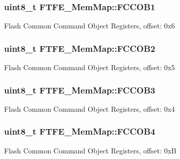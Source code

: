 \subsubsection[{F\+C\+C\+O\+B1}]{\setlength{\rightskip}{0pt plus 5cm}uint8\+\_\+t F\+T\+F\+E\+\_\+\+Mem\+Map\+::\+F\+C\+C\+O\+B1}\label{struct_f_t_f_e___mem_map_ab72be9c808d3ff0a1e61da8c56f59289}
Flash Common Command Object Registers, offset\+: 0x6 \hypertarget{struct_f_t_f_e___mem_map_a3ee3dde0b1da6205c9cbc4a8aba737ee}{}
\subsubsection[{F\+C\+C\+O\+B2}]{\setlength{\rightskip}{0pt plus 5cm}uint8\+\_\+t F\+T\+F\+E\+\_\+\+Mem\+Map\+::\+F\+C\+C\+O\+B2}\label{struct_f_t_f_e___mem_map_a3ee3dde0b1da6205c9cbc4a8aba737ee}
Flash Common Command Object Registers, offset\+: 0x5 \hypertarget{struct_f_t_f_e___mem_map_a0d9b934b80cc5802632699a965acb08c}{}
\subsubsection[{F\+C\+C\+O\+B3}]{\setlength{\rightskip}{0pt plus 5cm}uint8\+\_\+t F\+T\+F\+E\+\_\+\+Mem\+Map\+::\+F\+C\+C\+O\+B3}\label{struct_f_t_f_e___mem_map_a0d9b934b80cc5802632699a965acb08c}
Flash Common Command Object Registers, offset\+: 0x4 \hypertarget{struct_f_t_f_e___mem_map_a67f74d54b4ea83300912bfd3fd13f69c}{}
\subsubsection[{F\+C\+C\+O\+B4}]{\setlength{\rightskip}{0pt plus 5cm}uint8\+\_\+t F\+T\+F\+E\+\_\+\+Mem\+Map\+::\+F\+C\+C\+O\+B4}\label{struct_f_t_f_e___mem_map_a67f74d54b4ea83300912bfd3fd13f69c}
Flash Common Command Object Registers, offset\+: 0x\+B \hypertarget{struct_f_t_f_e___mem_map_a07c24a4727fa6aef7cb9a3119c5bf39a}{}

